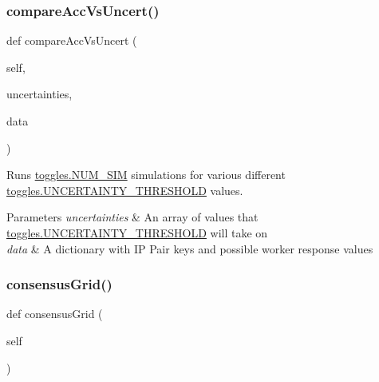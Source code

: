\mbox{\label{classdynamicfilterapp_1_1test__simulations_1_1_simulation_test_a1395b2cd07f422278160348baec14c9b}} 
\subsubsection{\texorpdfstring{compareAccVsUncert()}{compareAccVsUncert()}}
{\footnotesize\ttfamily def compare\+Acc\+Vs\+Uncert (\begin{DoxyParamCaption}\item[{}]{self,  }\item[{}]{uncertainties,  }\item[{}]{data }\end{DoxyParamCaption})}



Runs \mbox{\hyperlink{namespacedynamicfilterapp_1_1toggles_a3baf5565851cd87736238d8dddfc1106}{toggles.\+N\+U\+M\+\_\+\+S\+IM}} simulations for various different \mbox{\hyperlink{namespacedynamicfilterapp_1_1toggles_aaefdc27b85545eb4a910f5c65f7d8bbb}{toggles.\+U\+N\+C\+E\+R\+T\+A\+I\+N\+T\+Y\+\_\+\+T\+H\+R\+E\+S\+H\+O\+LD}} values. 


\begin{DoxyParams}{Parameters}
{\em uncertainties} & An array of values that \mbox{\hyperlink{namespacedynamicfilterapp_1_1toggles_aaefdc27b85545eb4a910f5c65f7d8bbb}{toggles.\+U\+N\+C\+E\+R\+T\+A\+I\+N\+T\+Y\+\_\+\+T\+H\+R\+E\+S\+H\+O\+LD}} will take on \\
\hline
{\em data} & A dictionary with IP Pair keys and possible worker response values \\
\hline
\end{DoxyParams}
\mbox{\label{classdynamicfilterapp_1_1test__simulations_1_1_simulation_test_ace5df674cddd1b8f77748b585a69feb9}} 
\subsubsection{\texorpdfstring{consensusGrid()}{consensusGrid()}}
{\footnotesize\ttfamily def consensus\+Grid (\begin{DoxyParamCaption}\item[{}]{self }\end{DoxyParamCaption})}

